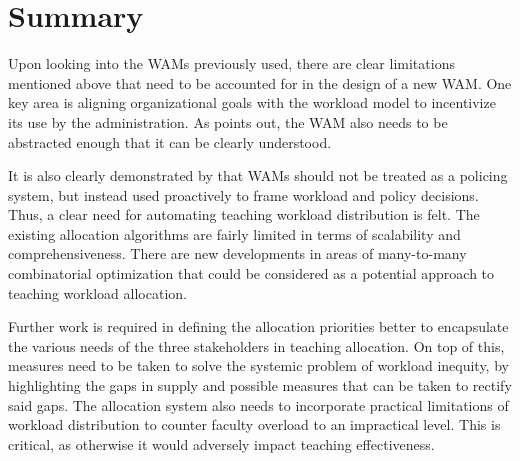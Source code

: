 \section{Summary}

Upon looking into the WAMs previously used, there are clear limitations mentioned above that need to be accounted for in the design of a new WAM. One key area is aligning organizational goals with the workload model to incentivize its use by the administration. As \parencite{vardi2009impacts} points out, the WAM also needs to be abstracted enough that it can be clearly understood.

It is also clearly demonstrated by \parencite{kenny2014effectiveness} that WAMs should not be treated as a policing system, but instead used proactively to frame workload and policy decisions. Thus, a clear need for automating teaching workload distribution is felt. The existing allocation algorithms are fairly limited in terms of scalability and comprehensiveness. There are new developments in areas of many-to-many combinatorial optimization that could be considered as a potential approach to teaching workload allocation.

Further work is required in defining the allocation priorities better to encapsulate the various needs of the three stakeholders in teaching allocation. On top of this, measures need to be taken to solve the systemic problem of workload inequity, by highlighting the gaps in supply and possible measures that can be taken to rectify said gaps. The allocation system also needs to incorporate practical limitations of workload distribution to counter faculty overload to an impractical level. This is critical, as otherwise it would adversely impact teaching effectiveness.